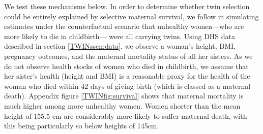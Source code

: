 \documentclass[subeqn]{article}
\begin{document}
\begin{spacing}{1.4}
We test these mechanisms below.  In order to determine whether twin selection
could be entirely explained by selective maternal survival, we follow 
\citet{Aldermanetal2011} in simulating estimates under the counterfactual 
scenario that unhealthy women---who are more likely to die in childbirth---%
were all carrying twins. Using DHS data described in section 
\ref{TWINsscn:data}, we observe a woman's height, BMI, pregnancy outcomes, and 
the maternal mortality status of all her sisters.  As we do not observe health 
stocks of women who died in childbirth, we assume that her sister's health 
(height and BMI) is a reasonable proxy for the health of the woman who died 
within 42 days of giving birth (which is classed as a maternal death).  Appendix 
figure \ref{TWINfig:survival} shows that maternal mortality is much higher among 
more unhealthy women.  Women shorter than the mean height of 155.5 cm are 
considerably more likely to suffer maternal death, with this being particularly 
so below heights of 145cm.


\end{spacing}
\end{document}
